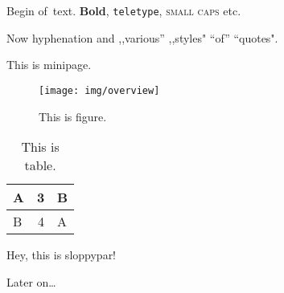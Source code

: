 

Begin of~text. \textbf{Bold}, \texttt{teletype}, \textsc{small caps} etc.

Now hy\-phe\-na\-tion and ,,various'' ,,styles" ``of'' ``quotes".

\begin{minipage}
This is minipage.
\end{minipage}

\begin{figure}[h]
	\centering
	\texttt{[image: img/overview]}
	\caption{This is figure.}
\end{figure}

\begin{table}[H]
\begin{tabular}{|l|r|l|}
\hline
A & 3 & B \\ \hline
B & 4 & A \\ \hline
\end{tabular}
\caption{This is table.}
\end{table}

\begin{sloppypar}
Hey, this is sloppypar!
\end{sloppypar}

Later on\ldots

